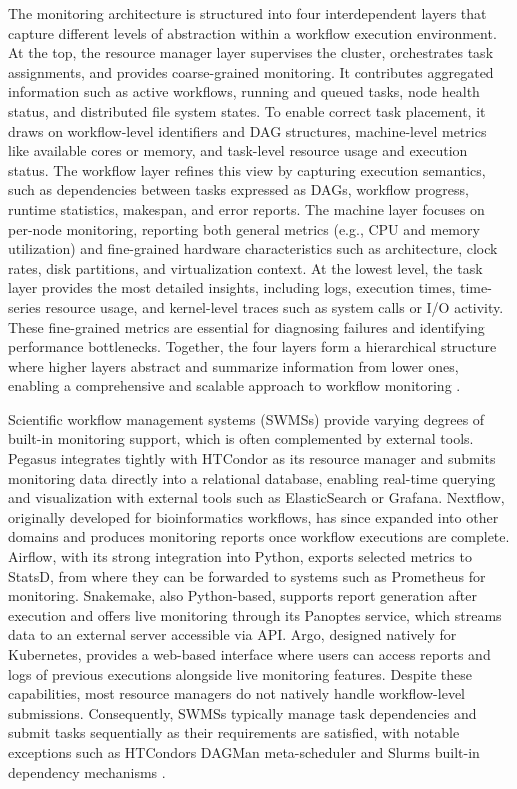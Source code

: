 The monitoring architecture is structured into four interdependent layers that capture different levels of abstraction within a workflow execution environment. At the top, the resource manager layer supervises the cluster, orchestrates task assignments, and provides coarse-grained monitoring. It contributes aggregated information such as active workflows, running and queued tasks, node health status, and distributed file system states. To enable correct task placement, it draws on workflow-level identifiers and DAG structures, machine-level metrics like available cores or memory, and task-level resource usage and execution status. The workflow layer refines this view by capturing execution semantics, such as dependencies between tasks expressed as DAGs, workflow progress, runtime statistics, makespan, and error reports. The machine layer focuses on per-node monitoring, reporting both general metrics (e.g., CPU and memory utilization) and fine-grained hardware characteristics such as architecture, clock rates, disk partitions, and virtualization context. At the lowest level, the task layer provides the most detailed insights, including logs, execution times, time-series resource usage, and kernel-level traces such as system calls or I/O activity. These fine-grained metrics are essential for diagnosing failures and identifying performance bottlenecks. Together, the four layers form a hierarchical structure where higher layers abstract and summarize information from lower ones, enabling a comprehensive and scalable approach to workflow monitoring \cite{Bader_2022}.

Scientific workflow management systems (SWMSs) provide varying degrees of built-in monitoring support, which is often complemented by external tools. Pegasus integrates tightly with HTCondor as its resource manager and submits monitoring data directly into a relational database, enabling real-time querying and visualization with external tools such as ElasticSearch or Grafana. Nextflow, originally developed for bioinformatics workflows, has since expanded into other domains and produces monitoring reports once workflow executions are complete. Airflow, with its strong integration into Python, exports selected metrics to StatsD, from where they can be forwarded to systems such as Prometheus for monitoring. Snakemake, also Python-based, supports report generation after execution and offers live monitoring through its Panoptes service, which streams data to an external server accessible via API. Argo, designed natively for Kubernetes, provides a web-based interface where users can access reports and logs of previous executions alongside live monitoring features. Despite these capabilities, most resource managers do not natively handle workflow-level submissions. Consequently, SWMSs typically manage task dependencies and submit tasks sequentially as their requirements are satisfied, with notable exceptions such as HTCondors DAGMan meta-scheduler and Slurms built-in dependency mechanisms \cite{Bader_2022}.

